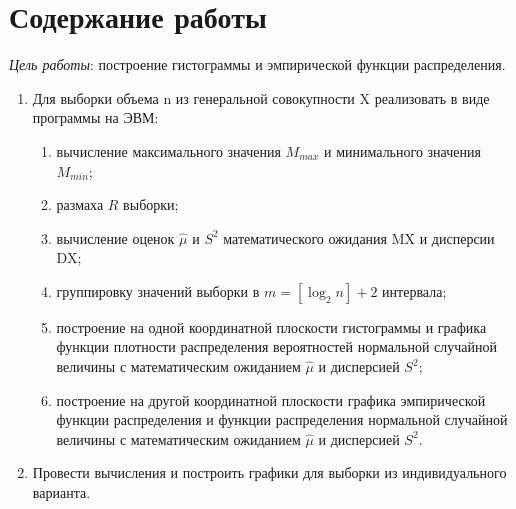 \chapter{Содержание работы}
\textit{Цель работы}: построение гистограммы и эмпирической функции распределения.
\begin{enumerate}[wide=0pt]
	\item Для выборки объема n из генеральной совокупности X реализовать в виде программы на ЭВМ:
	\begin{enumerate}
		\item вычисление максимального значения $M_{max}$ и минимального значения $M_{min}$;
		\item размаха $R$ выборки;
		\item вычисление оценок $\hat{\mu}$ и $S^2$ математического ожидания MX и дисперсии DX;
		\item группировку значений выборки в $m = [\log_2n] + 2$ интервала;
		\item построение на одной координатной плоскости гистограммы и графика функции плотности распределения вероятностей нормальной случайной величины с математическим ожиданием $\hat{\mu}$ и дисперсией $S^2$;
		\item построение на другой координатной плоскости графика эмпирической функции распределения и функции распределения нормальной случайной величины с математическим ожиданием $\hat{\mu}$ и дисперсией $S^2$.
	\end{enumerate}
	\item Провести вычисления и построить графики для выборки из индивидуального варианта.
\end{enumerate}

